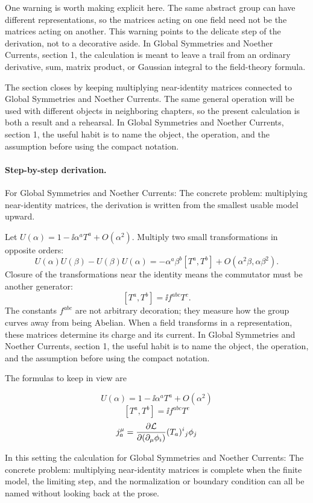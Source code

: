 One warning is worth making explicit here.  The same abstract group can have different representations, so the matrices acting on one field need not be the matrices acting on another.  This warning points to the delicate step of the derivation, not to a decorative aside.  In Global Symmetries and Noether Currents, section 1, the calculation is meant to leave a trail from an ordinary derivative, sum, matrix product, or Gaussian integral to the field-theory formula.

The section closes by keeping multiplying near-identity matrices connected to Global Symmetries and Noether Currents.  The same general operation will be used with different objects in neighboring chapters, so the present calculation is both a result and a rehearsal.  In Global Symmetries and Noether Currents, section 1, the useful habit is to name the object, the operation, and the assumption before using the compact notation.



\paragraph{Step-by-step derivation.}

For Global Symmetries and Noether Currents: The concrete problem: multiplying near-identity matrices, the derivation is written from the smallest usable model upward.

Let \(U(\alpha)=1-\ii\alpha^aT^a+O(\alpha^2)\).  Multiply two small transformations in opposite orders:
\[
  U(\alpha)U(\beta)-U(\beta)U(\alpha)
  =
  -\alpha^a\beta^b[T^a,T^b]+O(\alpha^2\beta,\alpha\beta^2).
\]
Closure of the transformations near the identity means the commutator must be another generator:
\[
  [T^a,T^b]=\ii f^{abc}T^c.
\]
The constants \(f^{abc}\) are not arbitrary decoration; they measure how the group curves away from being Abelian.  When a field transforms in a representation, these matrices determine its charge and its current.  In Global Symmetries and Noether Currents, section 1, the useful habit is to name the object, the operation, and the assumption before using the compact notation.

The formulas to keep in view are

\[
  U(\alpha)=1-\ii\alpha^aT^a+O(\alpha^2)
\]
\[
  [T^a,T^b]=\ii f^{abc}T^c
\]
\[
  j^\mu_a=\frac{\partial\mathcal L}{\partial(\partial_\mu\phi_i)}(T_a)^i{}_j\phi_j
\]

In this setting the calculation for Global Symmetries and Noether Currents: The concrete problem: multiplying near-identity matrices is complete when the finite model, the limiting step, and the normalization or boundary condition can all be named without looking back at the prose.




